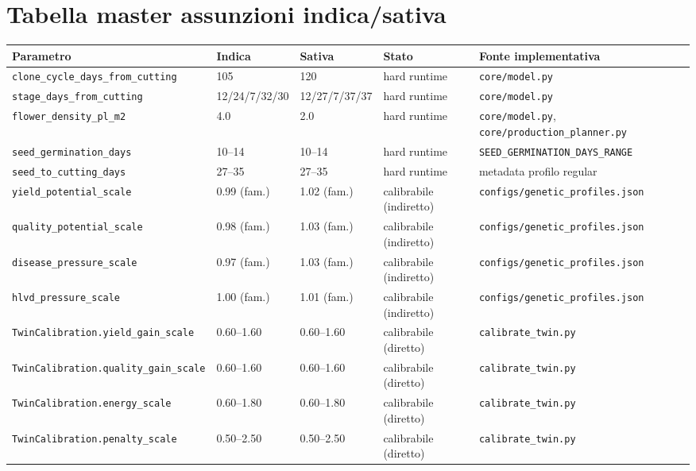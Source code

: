 ﻿\documentclass[11pt,a4paper]{report}
\begin{document}
\section{Tabella master assunzioni indica/sativa}
\begin{longtable}{@{}p{3.5cm}p{2.0cm}p{2.0cm}p{2.2cm}p{3.8cm}@{}}
\toprule
Parametro & Indica & Sativa & Stato & Fonte implementativa \\ \midrule
\texttt{clone\_cycle\_days\_from\_cutting} & 105 & 120 & hard runtime & \texttt{core/model.py} \\
\texttt{stage\_days\_from\_cutting} & 12/24/7/32/30 & 12/27/7/37/37 & hard runtime & \texttt{core/model.py} \\
\texttt{flower\_density\_pl\_m2} & 4.0 & 2.0 & hard runtime & \texttt{core/model.py}, \texttt{core/production\_planner.py} \\
\texttt{seed\_germination\_days} & 10--14 & 10--14 & hard runtime & \texttt{SEED\_GERMINATION\_DAYS\_RANGE} \\
\texttt{seed\_to\_cutting\_days} & 27--35 & 27--35 & hard runtime & metadata profilo regular \\
\texttt{yield\_potential\_scale} & 0.99 (fam.) & 1.02 (fam.) & calibrabile (indiretto) & \texttt{configs/genetic\_profiles.json} \\
\texttt{quality\_potential\_scale} & 0.98 (fam.) & 1.03 (fam.) & calibrabile (indiretto) & \texttt{configs/genetic\_profiles.json} \\
\texttt{disease\_pressure\_scale} & 0.97 (fam.) & 1.03 (fam.) & calibrabile (indiretto) & \texttt{configs/genetic\_profiles.json} \\
\texttt{hlvd\_pressure\_scale} & 1.00 (fam.) & 1.01 (fam.) & calibrabile (indiretto) & \texttt{configs/genetic\_profiles.json} \\
\texttt{TwinCalibration.yield\_gain\_scale} & 0.60--1.60 & 0.60--1.60 & calibrabile (diretto) & \texttt{calibrate\_twin.py} \\
\texttt{TwinCalibration.quality\_gain\_scale} & 0.60--1.60 & 0.60--1.60 & calibrabile (diretto) & \texttt{calibrate\_twin.py} \\
\texttt{TwinCalibration.energy\_scale} & 0.60--1.80 & 0.60--1.80 & calibrabile (diretto) & \texttt{calibrate\_twin.py} \\
\texttt{TwinCalibration.penalty\_scale} & 0.50--2.50 & 0.50--2.50 & calibrabile (diretto) & \texttt{calibrate\_twin.py} \\
\bottomrule
\end{longtable}
\end{document}
